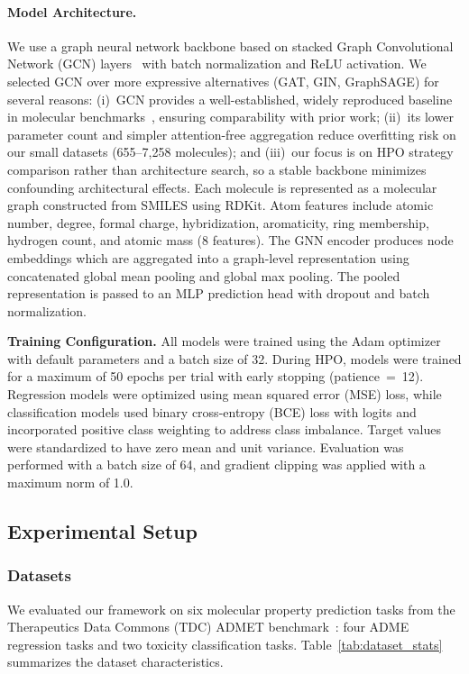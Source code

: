 \documentclass[12pt]{article}
\begin{document}
\paragraph{Model Architecture.}
We use a graph neural network backbone based on stacked Graph Convolutional Network (GCN) layers~\cite{kipf2017gcn} with batch normalization and ReLU activation. We selected GCN over more expressive alternatives (GAT, GIN, GraphSAGE) for several reasons: (i)~GCN provides a well-established, widely reproduced baseline in molecular benchmarks~\cite{wu2018moleculenet}, ensuring comparability with prior work; (ii)~its lower parameter count and simpler attention-free aggregation reduce overfitting risk on our small datasets (655--7{,}258 molecules); and (iii)~our focus is on HPO strategy comparison rather than architecture search, so a stable backbone minimizes confounding architectural effects. Each molecule is represented as a molecular graph constructed from SMILES using RDKit. Atom features include atomic number, degree, formal charge, hybridization, aromaticity, ring membership, hydrogen count, and atomic mass (8 features). The GNN encoder produces node embeddings which are aggregated into a graph-level representation using concatenated global mean pooling and global max pooling. The pooled representation is passed to an MLP prediction head with dropout and batch normalization.


\textbf{Training Configuration.} All models were trained using the Adam optimizer with default parameters and a batch size of 32. During HPO, models were trained for a maximum of 50 epochs per trial with early stopping (patience~=~12). Regression models were optimized using mean squared error (MSE) loss, while classification models used binary cross-entropy (BCE) loss with logits and incorporated positive class weighting to address class imbalance. Target values were standardized to have zero mean and unit variance. Evaluation was performed with a batch size of 64, and gradient clipping was applied with a maximum norm of 1.0.

\subsection{Experimental Setup}
\label{sec:experimental_setup}

\subsubsection{Datasets}

We evaluated our framework on six molecular property prediction tasks from the Therapeutics Data Commons (TDC) ADMET benchmark~\cite{huang2021therapeuticsdatacommonsmachine}: four ADME regression tasks and two toxicity classification tasks. Table~\ref{tab:dataset_stats} summarizes the dataset characteristics.
\end{document}
